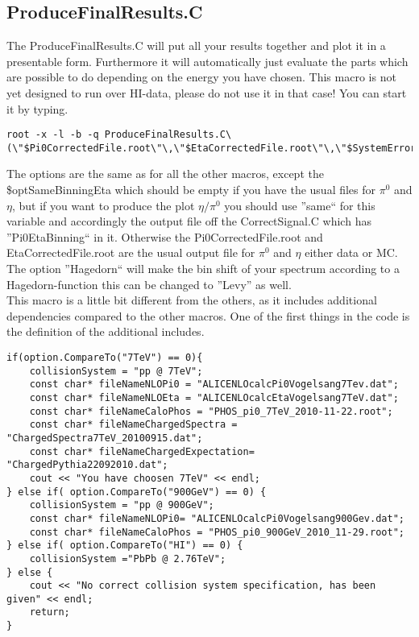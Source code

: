 		\subsection{ProduceFinalResults.C}
		The ProduceFinalResults.C will put all your results together and plot it in a presentable form. Furthermore it will automatically just evaluate the parts which are possible to do depending on the energy you have chosen. This macro is not yet designed to run over HI-data, please do not use it in that case! You can start it by typing.
		\begin{lstlisting}
root -x -l -b -q ProduceFinalResults.C\(\"$Pi0CorrectedFile.root\"\,\"$EtaCorrectedFile.root\"\,\"$SystemErrorPi0.dat\"\,\"$standardCut\"\,\"$CutNumber\"\,\"$optMC\"\,\"Hagedorn\"\,\"$optSameBinningEta\"\,\"$optEn\"\,\"$optConf\"\,\"$optMult\"\)	
		\end{lstlisting}
		The options are the same as for all the other macros, except the \$optSameBinningEta which should be empty if you have the usual files for $\pi^0$ and $\eta$, but if you want to produce the plot $\eta /\pi^0$ you should use ''same`` for this variable and accordingly the output file off the CorrectSignal.C which has ''Pi0EtaBinning`` in it. Otherwise the Pi0CorrectedFile.root and EtaCorrectedFile.root are the usual output file for $\pi^0$ and $\eta$ either data or MC. The option ''Hagedorn`` will make the bin shift of your spectrum according to a Hagedorn-function this can be changed to ''Levy'' as well. \\
		This macro is a little bit different from the others, as it includes additional dependencies compared to the other macros. One of the first things in the code is the definition of the additional includes.
\begin{lstlisting}
if(option.CompareTo("7TeV") == 0){
	collisionSystem = "pp @ 7TeV";		
	const char* fileNameNLOPi0 = "ALICENLOcalcPi0Vogelsang7Tev.dat";
	const char* fileNameNLOEta = "ALICENLOcalcEtaVogelsang7TeV.dat";
	const char* fileNameCaloPhos = "PHOS_pi0_7TeV_2010-11-22.root";
	const char* fileNameChargedSpectra = "ChargedSpectra7TeV_20100915.dat";
	const char* fileNameChargedExpectation= "ChargedPythia22092010.dat";
	cout << "You have choosen 7TeV" << endl;
} else if( option.CompareTo("900GeV") == 0) {
	collisionSystem = "pp @ 900GeV";
	const char* fileNameNLOPi0= "ALICENLOcalcPi0Vogelsang900Gev.dat";
	const char* fileNameCaloPhos = "PHOS_pi0_900GeV_2010_11-29.root";
} else if( option.CompareTo("HI") == 0) {
	collisionSystem ="PbPb @ 2.76TeV";
} else {
	cout << "No correct collision system specification, has been given" << endl;
	return;		
}
\end{lstlisting}
